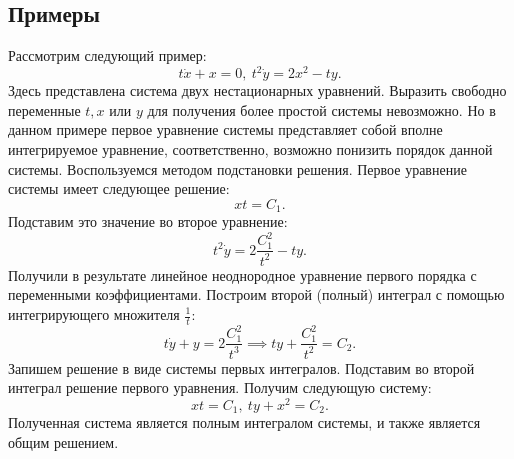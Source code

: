 	\subsection{Примеры}

		Рассмотрим следующий пример:
		\[ t\dot{x} + x = 0, ~ t^2 \dot{y} = 2x^2 - ty. \]
		Здесь представлена система двух нестационарных уравнений. Выразить свободно переменные $t, x$ или $y$ для получения более простой системы невозможно. Но в данном примере первое уравнение системы представляет собой вполне интегрируемое уравнение, соответственно, возможно понизить порядок данной системы. Воспользуемся методом подстановки решения. Первое уравнение системы имеет следующее решение:
		\[ xt = C_1. \]
		Подставим это значение во второе уравнение:
		\[ t^2 \dot{y} = 2 \frac{C_1^2}{t^2} - ty. \]
		Получили в результате линейное неоднородное уравнение первого порядка с переменными коэффициентами. Построим второй (полный) интеграл с помощью интегрирующего множителя $\frac{1}{t}$:
		\[ t\dot{y} + y = 2 \frac{C_1^2}{t^3} \implies ty + \frac{C_1^2}{t^2} = C_2. \]
		Запишем решение в виде системы первых интегралов. Подставим во второй интеграл решение первого уравнения. Получим следующую систему:
		\[ xt = C_1, ~ ty + x^2 = C_2. \]
		Полученная система является полным интегралом системы, и также является общим решением.

		\vspace{10pt}

